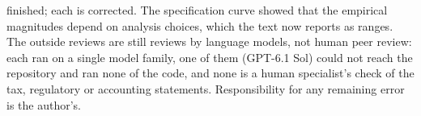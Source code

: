 finished; each is corrected. The specification curve showed that the empirical magnitudes depend on analysis choices, which the text now reports as ranges. The outside reviews are still reviews by language models, not human peer review: each ran on a single model family, one of them (GPT-6.1 Sol) could not reach the repository and ran none of the code, and none is a human specialist's check of the tax, regulatory or accounting statements. Responsibility for any remaining error is the author's.
